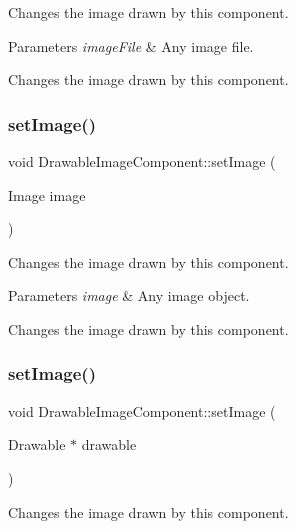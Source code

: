 Changes the image drawn by this component.


\begin{DoxyParams}{Parameters}
{\em image\+File} & Any image file.\\
\hline
\end{DoxyParams}
Changes the image drawn by this component. \mbox{\label{classDrawableImageComponent_a15816f3cb4e5208684a262bde75de7ff}} 
\subsubsection{\texorpdfstring{set\+Image()}{setImage()}\hspace{0.1cm}{\footnotesize\ttfamily [3/4]}}
{\footnotesize\ttfamily void Drawable\+Image\+Component\+::set\+Image (\begin{DoxyParamCaption}\item[{Image}]{image }\end{DoxyParamCaption})}

Changes the image drawn by this component.


\begin{DoxyParams}{Parameters}
{\em image} & Any image object.\\
\hline
\end{DoxyParams}
Changes the image drawn by this component. \mbox{\label{classDrawableImageComponent_a33fd94ab70a7dc014f6bdcb63fb6a6f9}} 
\subsubsection{\texorpdfstring{set\+Image()}{setImage()}\hspace{0.1cm}{\footnotesize\ttfamily [4/4]}}
{\footnotesize\ttfamily void Drawable\+Image\+Component\+::set\+Image (\begin{DoxyParamCaption}\item[{Drawable $\ast$}]{drawable }\end{DoxyParamCaption})}

Changes the image drawn by this component.


